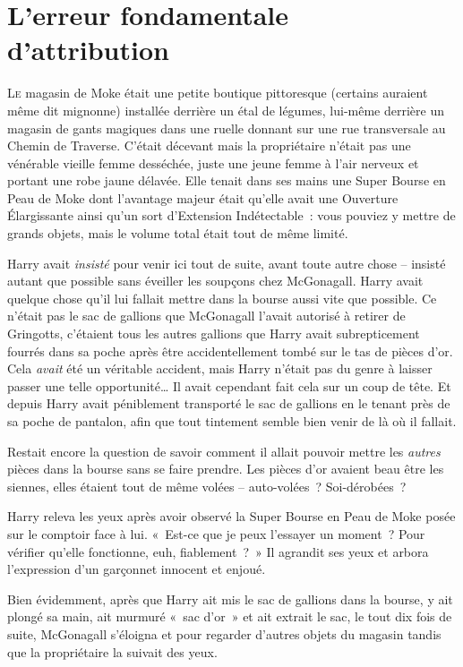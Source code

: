 \chapter{L'erreur fondamentale d'attribution}

\lettrine{L}{e} magasin de Moke était une petite boutique pittoresque (certains auraient même dit mignonne) installée derrière un étal de légumes, lui-même derrière un magasin de gants magiques dans une ruelle donnant sur une rue transversale au Chemin de Traverse. C'était décevant mais la propriétaire n'était pas une vénérable vieille femme desséchée, juste une jeune femme à l'air nerveux et portant une robe jaune délavée. Elle tenait dans ses mains une Super Bourse en Peau de Moke  dont l'avantage majeur était qu'elle avait une Ouverture Élargissante ainsi qu'un sort d'Extension Indétectable~: vous pouviez y mettre de grands objets, mais le volume total était tout de même limité.

Harry avait \emph{insisté} pour venir ici tout de suite, avant toute autre chose -- insisté autant que possible sans éveiller les soupçons chez McGonagall. Harry avait quelque chose qu'il lui fallait mettre dans la bourse aussi vite que possible. Ce n'était pas le sac de gallions que McGonagall l'avait autorisé à retirer de Gringotts, c'étaient tous les autres gallions que Harry avait subrepticement fourrés dans sa poche après être accidentellement tombé sur le tas de pièces d'or. Cela \emph{avait} été un véritable accident, mais Harry n'était pas du genre à laisser passer une telle opportunité… Il avait cependant fait cela sur un coup de tête. Et depuis Harry avait péniblement transporté le sac de gallions en le tenant près de sa poche de pantalon, afin que tout tintement semble bien venir de là où il fallait.

Restait encore la question de savoir comment il allait pouvoir mettre les \emph{autres} pièces dans la bourse sans se faire prendre. Les pièces d'or avaient beau être les siennes, elles étaient tout de même volées -- auto-volées~? Soi-dérobées~?

Harry releva les yeux après avoir observé la Super Bourse en Peau de Moke  posée sur le comptoir face à lui. «~Est-ce que je peux l'essayer un moment~? Pour vérifier qu'elle fonctionne, euh, fiablement~?~» Il agrandit ses yeux et arbora l'expression d'un garçonnet innocent et enjoué.

Bien évidemment, après que Harry ait mis le sac de gallions dans la bourse, y ait plongé sa main, ait murmuré «~sac d'or~» et ait extrait le sac, le tout dix fois de suite, McGonagall s'éloigna et pour regarder d'autres objets du magasin tandis que la propriétaire la suivait des yeux.

